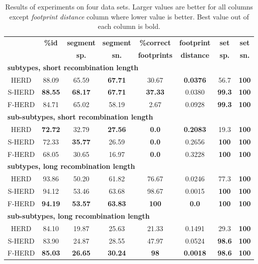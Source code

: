 \begin{table}
\begin{center}
\begin{tabular}{cccccccc}\hline
&{\bf \%id}&\bf segment&\bf segment&\bf \%correct&\bf footprint&\bf set&\bf  set\\ 
&&\bf sp.& \bf sn.& \bf footprints&\bf distance&\bf    sp.&\bf  sn.\\ 
\hline
\multicolumn{8}{l}{\bf subtypes, short recombination length}\\
HERD   &88.09& 65.59& {\bf 67.71}& 30.67& {\bf 0.0376}& 56.7&{\bf 100}\\
S-HERD &{\bf 88.55}& {\bf 68.17}& {\bf 67.71}& {\bf 37.33}& 0.0380& {\bf 99.3}&{\bf 100}\\
F-HERD &84.71& 65.02& 58.19& 2.67& 0.0928& {\bf 99.3}&{\bf 100}\\\hline
\multicolumn{8}{l}{\bf sub-subtypes, short recombination length}\\
HERD   &{\bf 72.72}& 32.79& {\bf 27.56}& {\bf 0.0}&    {\bf 0.2083}& 19.3&{\bf 100}\\
S-HERD &72.33&{\bf 35.77}& 26.59& {\bf 0.0}&    0.2656& {\bf 100}&{\bf 100}\\
F-HERD &68.05&30.65& 16.97& {\bf 0.0}&    0.3228& {\bf 100}&{\bf 100}\\\hline
\multicolumn{8}{l}{\bf subtypes, long recombination length}\\
HERD   &93.86& 50.20& 61.82& 76.67& 0.0246& 77.3&{\bf 100}\\
S-HERD &94.12& 53.46& 63.68& 98.67& 0.0015&   {\bf 100}&{\bf 100}\\
F-HERD &{\bf 94.19}& {\bf 53.57}& {\bf 63.83}& {\bf 100}&    {\bf 0.0}&
{\bf 100}&{\bf 100}\\\hline
\multicolumn{8}{l}{\bf sub-subtypes, long recombination length}\\
HERD   &84.10& 19.87& 25.63& 21.33& 0.1491& 29.3&{\bf 100}\\
S-HERD &83.90& 24.87& 28.55& 47.97& 0.0524& {\bf 98.6}&{\bf 100}\\
F-HERD &{\bf 85.03}& {\bf 26.65}& {\bf 30.24}& {\bf 98}&   {\bf 0.0018}& {\bf
98.6}&{\bf 100}\\
\end{tabular}
\end{center}
\caption[Results of F/S-HERD on artificial recombinants.]{Results of experiments
on four data sets. Larger values are better for all columns  except
{\it footprint distance} column where lower value is better. Best value out of
each column is bold.}\label{HERD:EXPTABLE}
\end{table}

